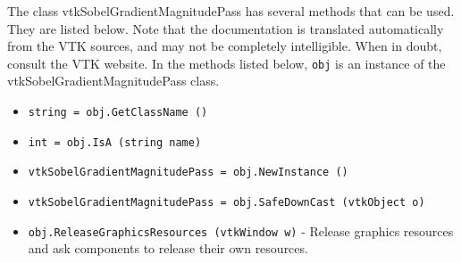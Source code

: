 The class vtkSobelGradientMagnitudePass has several methods that can be used.
  They are listed below.
Note that the documentation is translated automatically from the VTK sources,
and may not be completely intelligible.  When in doubt, consult the VTK website.
In the methods listed below, \verb|obj| is an instance of the vtkSobelGradientMagnitudePass class.
\begin{itemize}
\item  \verb|string = obj.GetClassName ()|

\item  \verb|int = obj.IsA (string name)|

\item  \verb|vtkSobelGradientMagnitudePass = obj.NewInstance ()|

\item  \verb|vtkSobelGradientMagnitudePass = obj.SafeDownCast (vtkObject o)|

\item  \verb|obj.ReleaseGraphicsResources (vtkWindow w)| -  Release graphics resources and ask components to release their own
 resources.
 

\end{itemize}
